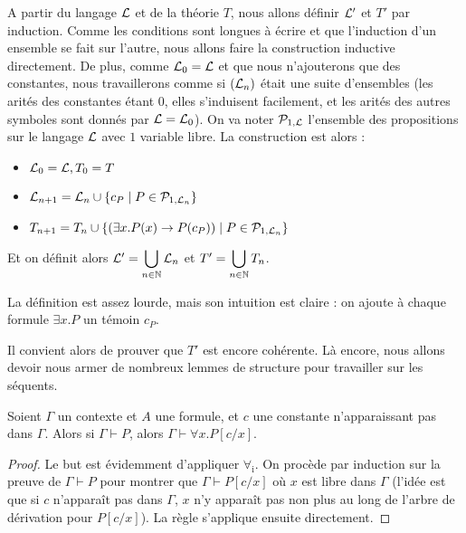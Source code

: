 \begin{defi}
    A partir du langage $\mathcal L$ et de la théorie $T$, nous allons définir $\mathcal L'$ et $T'$ par induction. Comme les conditions sont longues à écrire et que l'induction d'un ensemble se fait sur l'autre, nous allons faire la construction inductive directement. De plus, comme $\mathcal L_0=\mathcal L$ et que nous n'ajouterons que des constantes, nous travaillerons comme si $(\mathcal L_n)$ était une suite d'ensembles (les arités des constantes étant $0$, elles s'induisent facilement, et les arités des autres symboles sont donnés par $\mathcal L=\mathcal L_0$). On va noter $\mathcal P_{1,\mathcal L}$ l'ensemble des propositions sur le langage $\mathcal L$ avec $1$ variable libre. La construction est alors :
    \begin{itemize}[label=$\bullet$]
        \item $\mathcal L_0 = \mathcal L, T_0 = T$
        \item $\mathcal L_{n+1} = \mathcal L_n \cup \{ c_P \mid P \in \mathcal P_{1,\mathcal L_n}\}$
        \item $T_{n+1} = T_n \cup \{ (\exists x. P(x) \to P(c_P)) \mid P\in\mathcal P_{1,\mathcal L_n} \}$
    \end{itemize}
    Et on définit alors $\mathcal L' = \displaystyle{\bigcup_{n\in\mathbb{N}} \mathcal L_n}$ et $T' = \displaystyle{\bigcup_{n\in\mathbb{N}}T_n}$.
\end{defi}

La définition est assez lourde, mais son intuition est claire : on ajoute à chaque formule $\exists x.P$ un témoin $c_P$.

Il convient alors de prouver que $T'$ est encore cohérente. Là encore, nous allons devoir nous armer de nombreux lemmes de structure pour travailler sur les séquents.

\begin{lem}
    Soient $\Gamma$ un contexte et $A$ une formule, et $c$ une constante n'apparaissant pas dans $\Gamma$. Alors si $\Gamma\vdash P$, alors $\Gamma\vdash \forall x.P[c/x]$.
\end{lem}

\begin{proof}
    Le but est évidemment d'appliquer $\forall_\mathrm i$. On procède par induction sur la preuve de $\Gamma\vdash P$ pour montrer que $\Gamma\vdash P[c/x]$ où $x$ est libre dans $\Gamma$ (l'idée est que si $c$ n'apparaît pas dans $\Gamma$, $x$ n'y apparaît pas non plus au long de l'arbre de dérivation pour $P[c/x]$). La règle s'applique ensuite directement.
\end{proof}


